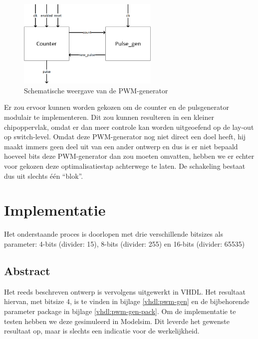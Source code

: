 \documentclass{article}
\begin{document}
\begin{figure}[H]
	\centering
	\includegraphics[width=0.6\textwidth]{resource/pwm_gen.png}
	\caption{Schematische weergave van de PWM-generator}
	\label{fig:pwm-schem}
\end{figure}

Er zou ervoor kunnen worden gekozen om de counter en de pulsgenerator modulair te implementeren. Dit zou kunnen resulteren in een kleiner chipoppervlak, omdat er dan meer controle kan worden uitgeoefend op de lay-out op switch-level. Omdat deze PWM-generator nog niet direct een doel heeft, hij maakt immers geen deel uit van een ander ontwerp en dus is er niet bepaald hoeveel bits deze PWM-generator dan zou moeten omvatten, hebben we er echter voor gekozen deze optimalisatiestap achterwege te laten. 
De schakeling bestaat dus uit slechts één ``blok''.

\section{Implementatie}
\label{sec:pwm-impl}
\footnotesize
Het onderstaande proces is doorlopen met drie verschillende bitsizes als parameter: 4-bits (divider: 15), 8-bits (divider: 255) en 16-bits (divider: 65535)

\normalsize
\subsection{Abstract}
\label{ssec:pwm-impl-abstr}
Het reeds beschreven ontwerp is vervolgens uitgewerkt in VHDL. Het resultaat hiervan, met bitsize 4, is te vinden in bijlage \ref{vhdl:pwm-gen} en de bijbehorende parameter package in bijlage \ref{vhdl:pwm-gen-pack}. Om de implementatie te testen hebben we deze gesimuleerd in Modelsim. Dit leverde het gewenste resultaat op, maar is slechts een indicatie voor de werkelijkheid.
\end{document}

